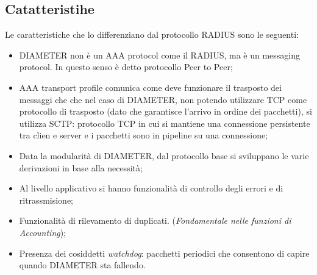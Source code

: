\documentclass{article}
\theoremstyle{remark}
\begin{document}
\subsection{Catatteristihe}
Le caratteristiche che lo differenziano dal protocollo RADIUS sono le seguenti:\begin{itemize}
	\item DIAMETER non è un AAA protocol come il RADIUS, ma è un messaging protocol. In questo senso è detto protocollo Peer to Peer;
	\item AAA transport profile comunica come deve funzionare il trasposto dei messaggi che che nel caso di DIAMETER, non potendo utilizzare TCP come protocollo di trasposto (dato che garantisce l'arrivo in ordine dei pacchetti), si utilizza SCTP: protocollo TCP in cui si mantiene una connessione persistente tra clien e server e i pacchetti sono in pipeline su una connessione;
	\item Data la modularità di DIAMETER, dal protocollo base si sviluppano le varie derivazioni in base alla necessità;
	\item Al livello applicativo si hanno funzionalità di controllo degli errori e di ritrassmisione;
	\item Funzionalità di rilevamento di duplicati. (\emph{Fondamentale nelle funzioni di Accounting});
	\item Presenza dei cosiddetti \emph{watchdog}: pacchetti periodici che consentono di capire quando DIAMETER sta fallendo.
\end{itemize}
\end{document}
